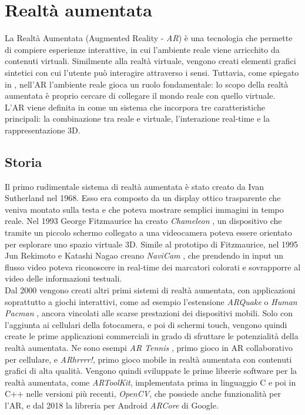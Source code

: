 \documentclass[crop=false, class=book]{standalone}
\begin{document}
	\chapter{Realtà aumentata}
	La Realtà Aumentata (Augmented Reality - \emph{AR}) è una tecnologia che permette di compiere esperienze interattive, in cui l'ambiente reale viene arricchito da contenuti virtuali. Similmente alla realtà virtuale, vengono creati elementi grafici sintetici con cui l'utente può interagire attraverso i sensi. Tuttavia, come spiegato in \cite{bimber2005spatial}, nell'AR l'ambiente reale gioca un ruolo fondamentale: lo scopo della realtà aumentata è proprio cercare di collegare il mondo reale con quello virtuale.
	\\
	L'AR viene definita in \cite{azuma1997survey} come un sistema che incorpora tre caratteristiche principali: la combinazione tra reale e virtuale, l'interazione real-time e la rappresentazione 3D. 
	
	\section{Storia}
	Il primo rudimentale sistema di realtà aumentata è stato creato da Ivan Sutherland \cite{sutherland1968head} nel 1968. Esso era composto da un display ottico trasparente che veniva montato sulla testa e che poteva mostrare semplici immagini in tempo reale. Nel 1993 George Fitzmaurice ha creato \textit{Chameleon} \cite{fitzmaurice1993situated}, un dispositivo che tramite un piccolo schermo collegato a una videocamera poteva essere orientato per esplorare uno spazio virtuale 3D. Simile al prototipo di Fitzmaurice, nel 1995 Jun Rekimoto e Katashi Nagao creano \textit{NaviCam} \cite{rekimoto1995world}, che prendendo in input un flusso video poteva riconoscere in real-time dei marcatori colorati e sovrapporre al video delle informazioni testuali. 
	\\
	Dal 2000 vengono creati altri primi sistemi di realtà aumentata, con applicazioni soprattutto a giochi interattivi, come ad esempio l'estensione \textit{ARQuake} \cite{thomas2000arquake} o \textit{Human Pacman} \cite{cheok2003human}, ancora vincolati alle scarse prestazioni dei dispositivi mobili. Solo con l'aggiunta ai cellulari della fotocamera, e poi di schermi touch, vengono quindi create le prime applicazioni commerciali in grado di sfruttare le potenzialità della realtà aumentata. Ne sono esempi \textit{AR Tennis} \cite{henrysson2006ARtennis}, primo gioco in AR collaborativo per cellulare, e \textit{ARhrrrr!}, primo gioco mobile in realtà aumentata con contenuti grafici di alta qualità. Vengono quindi sviluppate le prime librerie software per la realtà aumentata, come \textit{ARToolKit}, implementata prima in linguaggio C e poi in C++ nelle versioni più recenti, \textit{OpenCV}, che possiede anche funzionalità per l'AR, e dal 2018 la libreria per Android \textit{ARCore} di Google.
	
\end{document}
